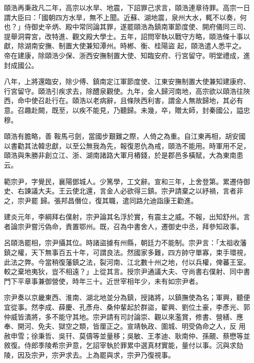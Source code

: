 \begin{pinyinscope}
 頤浩再秉政凡二年，高宗以水旱、地震，下詔罪己求言，頤浩連章待罪。高宗一日謂大臣曰：「國朝四方水旱，無不上聞。近蘇、湖地震，泉州大水，輒不以奏，何也？」侍御史辛炳、殿中常同論其罪，遂罷頤浩為鎮南軍節度使、開府儀同三司、提舉洞霄宮，改特進、觀文殿大學士。五年，詔問宰執以戰守方略，頤浩條十事以獻，除湖南安撫、制置大使兼知潭州。時郴、衡、桂陽盜
 起，頤浩遣人悉平之。帝在建康，除頤浩少保、浙西安撫制置大使、知臨安府、行宮留守。明堂禮成，進封成國公。



 八年，上將還臨安，除少傅、鎮南定江軍節度使、江東安撫制置大使兼知建康府、行宮留守。頤浩引疾求去，除醴泉觀使。九年，金人歸河南地，高宗欲以頤浩往陜西，命中使召赴行在。頤浩以老病辭，且條陜西利害，謂金人無故歸地，其必有意。召趣赴闕，既至，以疾不能見，乃聽歸。未幾，卒，贈太師，封秦國公，謚忠穆。



 頤浩有膽略，善
 鞍馬弓劍，當國步艱難之際，人倚之為重。自江東再相，胡安國以書勸其法韓忠獻，以至公無我為先，報復恩仇為戒，頤浩不能用。時軍用不足，頤浩與朱勝非創立江、浙、湖南諸路大軍月樁錢，於是郡邑多橫賦，大為東南患云。



 範宗尹，字覺民，襄陽鄧城人。少篤學，工文辭。宣和三年，上舍登第。累遷侍御史、右諫議大夫。王云使北還，言金人必欲得三鎮。宗尹請棄之以紓禍，言者非之，宗尹罷
 歸。張邦昌僭位，復其職，遣同路允迪詣康王勸進。



 建炎元年，李綱拜右僕射，宗尹論其名浮於實，有震主之威。不報，出知舒州。言者論宗尹嘗污偽命，責置鄂州。既，召為中書舍人，遷御史中丞，拜參知政事。



 呂頤浩罷相，宗尹攝其位。時諸盜據有州縣，朝廷力不能制。宗尹言：「太祖收藩鎮之權，天下無事百五十年，可謂良法。然國家多難，四方帥守單寡，束手環視，此法之弊。今當稍復藩鎮之法，裂河南、江北數十州之地，付以兵權，俾蕃王室。
 較之棄地夷狄，豈不相遠？」上從其言。授宗尹通議大夫、守尚書右僕射、同中書門下平章事兼御營使，時年三十。近世宰相年少，未有如宗尹者。



 宗尹奏以京畿東西、淮南、湖北地並分為鎮，授諸將，以鎮撫使為名；軍興，聽便宜從事。然李成、薛慶、孔彥舟、桑仲輩起於群盜，翟興、劉位土豪，李彥光、郭仲威皆潰將，多不能守其地。宗尹請有司討論崇、觀以來濫賞，修書、營繕、應奉、開河、免夫、獄空之類，皆厘正之。宣靖執政、圍城、明受偽命之人，反
 用赦申雪；徐秉哲、吳幵、莫儔等並量移；吳敏、王孝迪、耿南仲、孫覿、蔡懋等並敘復。侍郎季陵希宗尹意，乞詔宰執於罪累中選真材實能，量付以事。沉與求劾陵，因及宗尹，宗尹求去。上為罷與求，宗尹乃復視事。




\end{pinyinscope}
